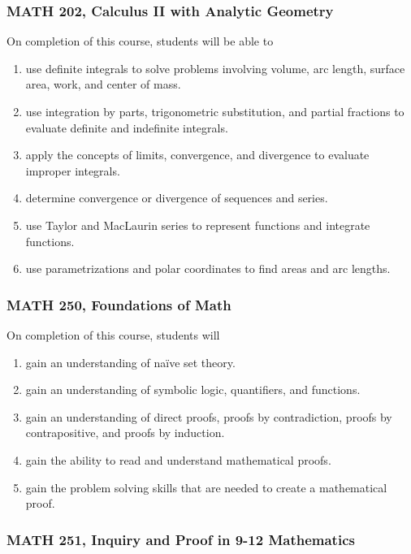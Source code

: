 \documentclass[11pt]{article}
\newenvironment{alphalist}{
\begin{enumerate}[label=(\arabic*),widest=107 ,leftmargin=25pt, itemsep=0pt]}
{\end{enumerate}}
\begin{document}
\subsubsection*{MATH 202, Calculus II with Analytic Geometry}

 On completion of this course, students will be able to
 \begin{alphalist}
    \item use definite integrals to solve problems involving volume, arc length, 
       surface area, work, and center of mass. 
    \item use integration by parts, trigonometric substitution, and partial fractions 
        to evaluate definite and indefinite integrals.
    \item apply the concepts of limits, convergence, and divergence to evaluate 
        improper integrals.
    \item determine convergence or divergence of sequences and series.
    \item use Taylor and MacLaurin series to represent functions and integrate 
        functions.
    \item use parametrizations and polar coordinates to find areas and arc lengths.
 \end{alphalist}

\subsubsection*{MATH 250, Foundations of Math}


On completion of this course, students will
\begin{alphalist}
    \item gain an understanding of naïve set theory. 
    \item gain an understanding of symbolic logic, quantifiers, and functions.
    \item gain an understanding of direct proofs, proofs by contradiction, proofs by contrapositive, and proofs by induction.
    \item gain the ability to read and understand mathematical proofs.
    \item gain the problem solving skills that are needed to create a mathematical proof.
\end{alphalist}

\subsubsection*{MATH 251, Inquiry and Proof in 9-12 Mathematics}
\end{document}
